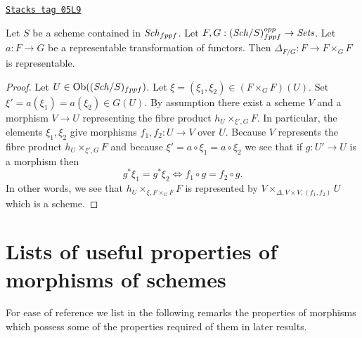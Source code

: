 \begin{lemma}
\label{spaces-lemma-representable-transformation-diagonal}
\href{https://stacks.math.columbia.edu/tag/05L9}{\texttt{Stacks tag 05L9}}

Let $S$ be a scheme contained in $\mathit{Sch}_{fppf}$.
Let $F, G : (\mathit{Sch}/S)_{fppf}^{opp} \to \textit{Sets}$.
Let $a : F \to G$ be a representable transformation of functors.
Then $\Delta_{F/G} : F \to F \times_G F$ is representable.
\end{lemma}

\begin{proof}
Let $U \in \operatorname{Ob}((\mathit{Sch}/S)_{fppf})$. Let
$\xi = (\xi_1, \xi_2) \in (F \times_G F)(U)$.
Set $\xi' = a(\xi_1) = a(\xi_2) \in G(U)$.
By assumption there exist a scheme $V$ and a morphism $V \to U$
representing the fibre product $h_U \times_{\xi', G} F$.
In particular, the elements $\xi_1, \xi_2$ give morphisms
$f_1, f_2 : U \to V$ over $U$. Because $V$ represents the
fibre product $h_U \times_{\xi', G} F$ and because
$\xi' = a \circ \xi_1 = a \circ \xi_2$
we see that if $g : U' \to U$ is a morphism then
$$
g^*\xi_1 = g^*\xi_2
\Leftrightarrow
f_1 \circ g = f_2 \circ g.
$$
In other words, we see that $h_U \times_{\xi, F \times_G F} F$
is represented by $V \times_{\Delta, V \times V, (f_1, f_2)} U$
which is a scheme.
\end{proof}

\section{Lists of useful properties of morphisms of schemes}
\label{spaces-section-lists}
For ease of reference we list in the following remarks the
properties of morphisms which possess some of the properties
required of them in later results.

